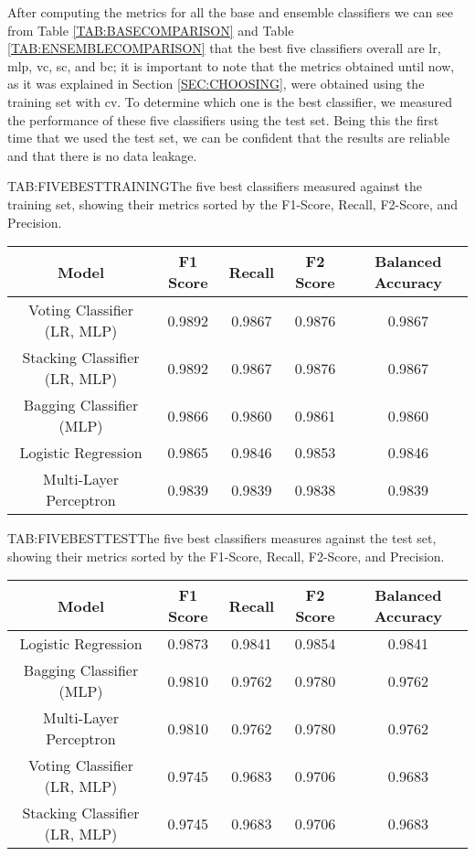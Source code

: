 After computing the metrics for all the base and ensemble classifiers we can see from Table \ref{TAB:BASECOMPARISON} and Table \ref{TAB:ENSEMBLECOMPARISON} that the best five classifiers overall are \acl{lr}, \acl{mlp}, \acl{vc}, \acl{sc}, and \acl{bc}; it is important to note that the metrics obtained until now, as it was explained in Section \ref{SEC:CHOOSING}, were obtained using the training set with \acl{cv}. To determine which one is the best classifier, we measured the performance of these five classifiers using the test set. Being this the first time that we used the test set, we can be confident that the results are reliable and that there is no data leakage. 

\begin{table}[Five Best Classifiers Against Training Set]{TAB:FIVEBESTTRAINING}{The five best classifiers measured against the training set, showing their metrics sorted by the F1-Score, Recall, F2-Score, and Precision.}
    \begin{tabular}{|c|c|c|c|c|}
        \hline
        \textbf{Model} & \textbf{F1 Score} & \textbf{Recall} & \textbf{F2 Score} & \textbf{Balanced Accuracy} \\
        \hline
        Voting Classifier (LR, MLP)   & 0.9892 & 0.9867 & 0.9876 & 0.9867 \\
        Stacking Classifier (LR, MLP) & 0.9892 & 0.9867 & 0.9876 & 0.9867 \\
        Bagging Classifier (MLP)      & 0.9866 & 0.9860 & 0.9861 & 0.9860 \\
        Logistic Regression           & 0.9865 & 0.9846 & 0.9853 & 0.9846 \\
        Multi-Layer Perceptron        & 0.9839 & 0.9839 & 0.9838 & 0.9839 \\
        \hline
    \end{tabular}
\end{table}

\begin{table}[Five Best Classifiers Against Test Set]{TAB:FIVEBESTTEST}{The five best classifiers measures against the test set, showing their metrics sorted by the F1-Score, Recall, F2-Score, and Precision.}
    \begin{tabular}{|c|c|c|c|c|}
        \hline
        \textbf{Model} & \textbf{F1 Score} & \textbf{Recall} & \textbf{F2 Score} & \textbf{Balanced Accuracy} \\
        \hline
        Logistic Regression           & 0.9873 & 0.9841 & 0.9854 & 0.9841 \\
        Bagging Classifier (MLP)      & 0.9810 & 0.9762 & 0.9780 & 0.9762 \\
        Multi-Layer Perceptron        & 0.9810 & 0.9762 & 0.9780 & 0.9762 \\
        Voting Classifier (LR, MLP)   & 0.9745 & 0.9683 & 0.9706 & 0.9683 \\
        Stacking Classifier (LR, MLP) & 0.9745 & 0.9683 & 0.9706 & 0.9683 \\
        \hline
    \end{tabular}
\end{table}

